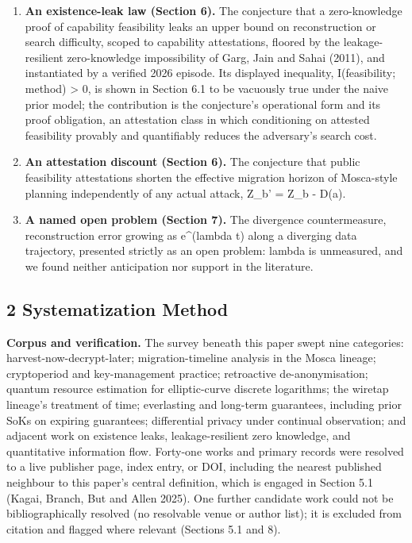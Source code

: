 \documentclass[
]{llncs}
\begin{document}
\begin{enumerate}
  integrity, not confidentiality (Vigil et al.~2015).
\item
  \textbf{An existence-leak law (Section 6).} The conjecture that a
  zero-knowledge proof of capability feasibility leaks an upper bound on
  reconstruction or search difficulty, scoped to capability
  attestations, floored by the leakage-resilient zero-knowledge
  impossibility of Garg, Jain and Sahai (2011), and instantiated by a
  verified 2026 episode. Its displayed inequality, I(feasibility;
  method) \textgreater{} 0, is shown in Section 6.1 to be vacuously true
  under the naive prior model; the contribution is the conjecture's
  operational form and its proof obligation, an attestation class in
  which conditioning on attested feasibility provably and quantifiably
  reduces the adversary's search cost.
\item
  \textbf{An attestation discount (Section 6).} The conjecture that
  public feasibility attestations shorten the effective migration
  horizon of Mosca-style planning independently of any actual attack,
  Z\_b' = Z\_b - D(a).
\item
  \textbf{A named open problem (Section 7).} The divergence
  countermeasure, reconstruction error growing as e\^{}(lambda t) along
  a diverging data trajectory, presented strictly as an open problem:
  lambda is unmeasured, and we found neither anticipation nor support in
  the literature.
\end{enumerate}

\subsection{2 Systematization Method}\label{systematization-method}

\textbf{Corpus and verification.} The survey beneath this paper swept
nine categories: harvest-now-decrypt-later; migration-timeline analysis
in the Mosca lineage; cryptoperiod and key-management practice;
retroactive de-anonymisation; quantum resource estimation for
elliptic-curve discrete logarithms; the wiretap lineage's treatment of
time; everlasting and long-term guarantees, including prior SoKs on
expiring guarantees; differential privacy under continual observation;
and adjacent work on existence leaks, leakage-resilient zero knowledge,
and quantitative information flow. Forty-one works and primary records
were resolved to a live publisher page, index entry, or DOI, including
the nearest published neighbour to this paper's central definition,
which is engaged in Section 5.1 (Kagai, Branch, But and Allen 2025). One
further candidate work could not be bibliographically resolved (no
resolvable venue or author list); it is excluded from citation and
flagged where relevant (Sections 5.1 and 8).
\end{document}
